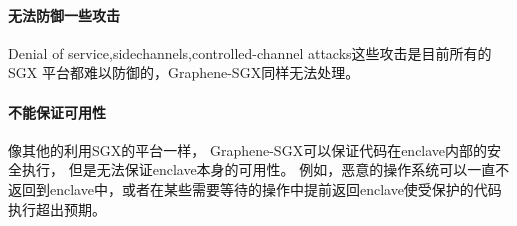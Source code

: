 \documentclass{article}
\begin{document}
\paragraph{无法防御一些攻击}
Denial of service,sidechannels,controlled-channel attacks这些攻击是目前所有的 SGX 平台都难以防御的，Graphene-SGX同样无法处理。
\paragraph{不能保证可用性}
像其他的利用SGX的平台一样，
Graphene-SGX可以保证代码在enclave内部的安全执行，
但是无法保证enclave本身的可用性。
例如，恶意的操作系统可以一直不返回到enclave中，或者在某些需要等待的操作中提前返回enclave使受保护的代码执行超出预期。


\printbibliography
\end{document}
